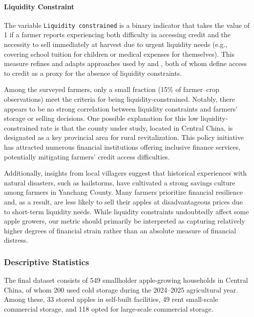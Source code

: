 \documentclass[12pt]{article}
\begin{document}
\paragraph{Liquidity Constraint} The variable \texttt{Liquidity constrained} is a binary indicator that takes the value of 1 if a farmer reports experiencing both difficulty in accessing credit and the necessity to sell immediately at harvest due to urgent liquidity needs (e.g., covering school tuition for children or medical expenses for themselves). This measure refines and adapts approaches used by \cite{albuquerque2024market} and \cite{stephens2011incomplete}, both of whom define access to credit as a proxy for the absence of liquidity constraints. 

Among the surveyed farmers, only a small fraction (15\% of farmer–crop observations) meet the criteria for being liquidity-constrained. Notably, there appears to be no strong correlation between liquidity constraints and farmers' storage or selling decisions. One possible explanation for this low liquidity-constrained rate is that the county under study, located in Central China, is designated as a key provincial area for rural revitalization. This policy initiative has attracted numerous financial institutions offering inclusive finance services, potentially mitigating farmers' credit access difficulties. 

Additionally, insights from local villagers suggest that historical experiences with natural disasters, such as hailstorms, have cultivated a strong savings culture among farmers in Yanchang County. Many farmers prioritize financial resilience and, as a result, are less likely to sell their apples at disadvantageous prices due to short-term liquidity needs. While liquidity constraints undoubtedly affect some apple growers, our metric should primarily be interpreted as capturing relatively higher degrees of financial strain rather than an absolute measure of financial distress.

\subsubsection{Descriptive Statistics}  
\noindent The final dataset consists of 549 smallholder apple-growing households in Central China, of whom 200 used cold storage during the 2024–2025 agricultural year. Among these, 33 stored apples in self-built facilities, 49 rent small-scale commercial storage, and 118 opted for large-scale commercial storage.  
\end{document}
